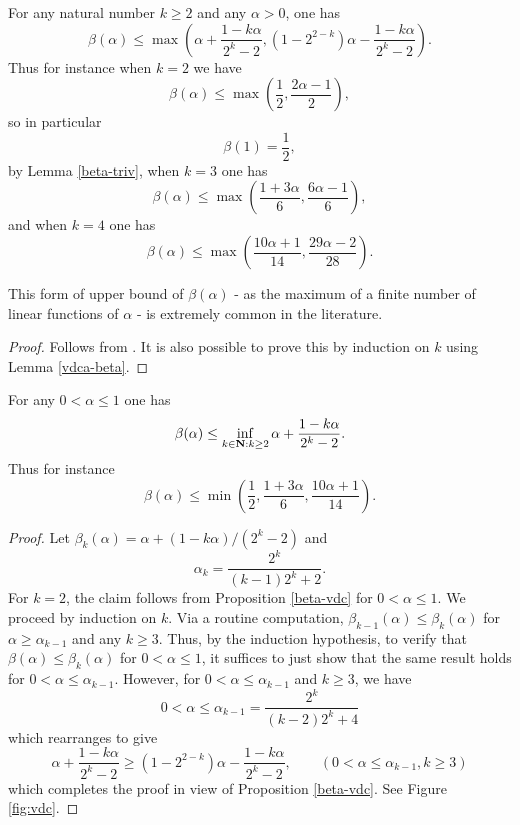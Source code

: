 \begin{proposition}\label{beta-vdc}\leanok For any natural number $k \geq 2$ and any $\alpha>0$, one has
    $$ \beta(\alpha) \leq \max\left( \alpha + \frac{1-k\alpha}{2^k-2}, (1 - 2^{2-k})\alpha - \frac{1-k\alpha}{2^k-2}\right).$$
    Thus for instance when $k=2$ we have
    $$ \beta(\alpha) \leq \max\left( \frac{1}{2}, \frac{2\alpha-1}{2} \right),$$
    so in particular
    \begin{equation}\label{beta-1}
        \beta(1)= \frac{1}{2},
    \end{equation}
        by Lemma \ref{beta-triv},
    when $k=3$ one has
    $$ \beta(\alpha) \leq \max\left( \frac{1+3\alpha}{6}, \frac{6\alpha-1}{6} \right),$$
    and when $k=4$ one has
    $$ \beta(\alpha) \leq \max\left( \frac{10\alpha+1}{14}, \frac{29\alpha-2}{28} \right).$$
\end{proposition}

This form of upper bound of $\beta(\alpha)$ - as the maximum of a finite number of linear functions of $\alpha$ - is extremely common in the literature.

\begin{proof}\leanok Follows from \cite[Theorem 8.20]{ik}. It is also possible to prove this by induction on $k$ using Lemma \ref{vdca-beta}.
\end{proof}

    \begin{corollary}\label{vdc-opt}\leanok  For any $0 < \alpha \leq 1$ one has
    $$\beta(\alpha) \leq \inf_{k \in \mathbf{N}: k \geq 2} \alpha + \frac{1-k\alpha}{2^k-2}.$$
    Thus for instance
    $$ \beta(\alpha) \leq \min\left( \frac{1}{2}, \frac{1+3\alpha}{6}, \frac{10\alpha+1}{14}\right).$$
    \end{corollary}

\begin{proof}\leanok
Let $\beta_k(\alpha) = \alpha + (1 - k\alpha)/(2^k - 2)$ and
\[
\alpha_k = \frac{2^k}{(k - 1)2^k + 2}.
\]
For $k=2$, the claim follows from Proposition \ref{beta-vdc} for $0 < \alpha \leq 1$. We proceed by induction on $k$. Via a routine computation, $\beta_{k-1}(\alpha) \le \beta_k(\alpha)$ for $\alpha \ge \alpha_{k-1}$ and any $k \ge 3$. Thus, by the induction hypothesis, to verify that $\beta(\alpha) \le \beta_k(\alpha)$ for $0 < \alpha \leq 1$, it suffices to just show that the same result holds for $0 < \alpha \le \alpha_{k-1}$. However, for $0 < \alpha \le \alpha_{k-1}$ and $k \ge 3$, we have
\[
0 < \alpha \le \alpha_{k-1} = \frac{2^k}{(k - 2)2^k + 4}
\]
which rearranges to give
\[
\alpha + \frac{1-k\alpha}{2^k-2}\geq (1 - 2^{2-k})\alpha - \frac{1-k\alpha}{2^k-2},\qquad (0 < \alpha \le \alpha_{k-1}, k \ge 3)
\]
which completes the proof in view of Proposition \ref{beta-vdc}.  See Figure \ref{fig:vdc}.
\end{proof}


